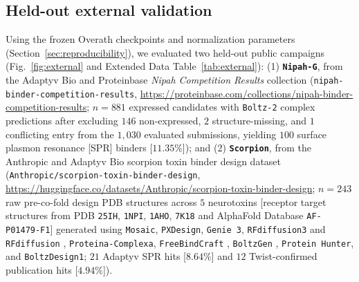 \documentclass[10pt,twocolumn]{article}
\begin{document}
\subsection{Held-out external validation}
Using the frozen Overath checkpoints and normalization parameters (Section~\ref{sec:reproducibility}), we evaluated two held-out public campaigns (Fig.~\ref{fig:external} and Extended Data Table~\ref{tab:external}): (1) \textbf{\texttt{Nipah-G}}, from the Adaptyv Bio and Proteinbase \textit{Nipah Competition Results} collection (\texttt{nipah-binder-competition-results}, \url{https://proteinbase.com/collections/nipah-binder-competition-results}; $n=881$ expressed candidates with \texttt{Boltz-2} complex predictions \cite{passaro2025boltz2} after excluding $146$ non-expressed, $2$ structure-missing, and $1$ conflicting entry from the $1,030$ evaluated submissions, yielding $100$ surface plasmon resonance [SPR] binders [$11.35\%$]); and (2) \textbf{\texttt{Scorpion}}, from the Anthropic and Adaptyv Bio scorpion toxin binder design dataset (\texttt{Anthropic/scorpion-toxin-binder-design}, \url{https://huggingface.co/datasets/Anthropic/scorpion-toxin-binder-design}; $n=243$ raw pre-co-fold design PDB structures across $5$ neurotoxins [receptor target structures from PDB \texttt{25IH}, \texttt{1NPI}, \texttt{1AHO}, \texttt{7K18} and AlphaFold Database \texttt{AF-P01479-F1}] generated using \texttt{Mosaic}, \texttt{PXDesign}, \texttt{Genie 3}, \texttt{RFdiffusion3} and \texttt{RFdiffusion} \cite{watson2023de}, \texttt{Proteina-Complexa}, \texttt{FreeBindCraft} \cite{pacesa2024bindcraft}, \texttt{BoltzGen} \cite{stark2025boltzgen}, \texttt{Protein Hunter}, and \texttt{BoltzDesign1}; $21$ Adaptyv SPR hits [$8.64\%$] and $12$ Twist-confirmed publication hits [$4.94\%$]).
\end{document}
